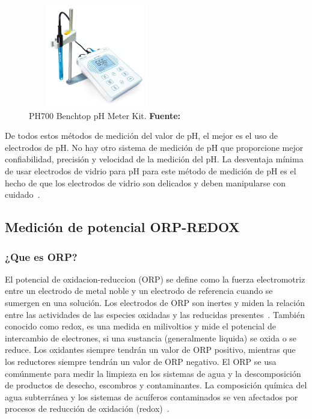 \begin{itemize}
\begin{figure}[ht]
    \centering
    \includegraphics[width=60mm, height=45mm]{Imagenes/cap2/ph700.png}
    \caption {PH700 Benchtop pH Meter Kit. \textbf{Fuente:}
    \cite{ph700_nodate} }
    \label{fig:ph700}
    \end{figure}
\end{itemize}

De todos estos métodos de medición del valor de pH,  el mejor es el uso de electrodos de pH. 
No hay otro sistema de medición de pH que proporcione mejor confiabilidad, precisión y velocidad de la medición del pH. 
La desventaja mínima de usar electrodos de vidrio para pH para este m\'etodo de medici\'on de pH es el hecho de que los electrodos de vidrio son delicados y deben manipularse con cuidado~\cite{li_chapter_2019}.


\subsection{Medición de potencial ORP-REDOX}
\subsubsection{¿Que es ORP?}
El potencial de oxidacion-reduccion (ORP) se define como la fuerza electromotriz entre un electrodo de metal noble y un electrodo de referencia cuando se sumergen en una solución.
Los electrodos de ORP son inertes y miden la relación entre las actividades de las especies oxidadas y las reducidas presentes~\cite{d19_committee_test_nodate}.
También conocido como redox, es una medida en milivoltios y mide el potencial de intercambio de electrones, si una sustancia (generalmente liquida) se oxida o se reduce. 
Los oxidantes siempre tendrán un valor de ORP positivo, mientras que los reductores siempre tendrán un valor de ORP negativo. 
El ORP se usa comúnmente para medir la limpieza en los sistemas de agua y la descomposición de productos de desecho, escombros y contaminantes. 
La composición química del agua subterránea y los sistemas de acuíferos contaminados se ven afectados por procesos de reducción de oxidación (redox)~\cite{wator_redox_2020}.

